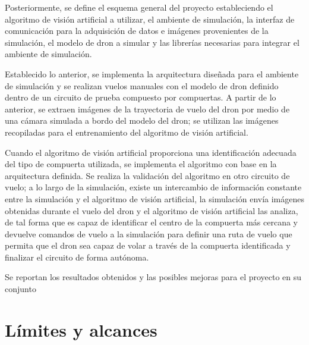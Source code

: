 Posteriormente, se define el esquema general del proyecto estableciendo el algoritmo de visión artificial a utilizar, el ambiente de simulación, la interfaz de comunicación para la adquisición de datos e imágenes provenientes de la simulación, el modelo de dron a simular y las librerías necesarias para integrar el ambiente de simulación.

Establecido lo anterior, se implementa la arquitectura diseñada para el ambiente de simulación y se realizan vuelos manuales con el modelo de dron definido dentro de un circuito de prueba compuesto por compuertas. A partir de lo anterior, se extraen imágenes de la trayectoria de vuelo del dron por medio de una cámara simulada a bordo del modelo del dron; se utilizan las imágenes recopiladas para el entrenamiento del algoritmo de visión artificial.

Cuando el algoritmo de visión artificial proporciona una identificación adecuada del tipo de compuerta utilizada, se implementa el algoritmo con base en la arquitectura definida. Se realiza la validación del algoritmo en otro circuito de vuelo; a lo largo de la simulación, existe un intercambio de información constante entre la simulación y el algoritmo de visión artificial, la simulación envía imágenes obtenidas durante el vuelo del dron y el algoritmo de visión artificial las analiza, de tal forma que es capaz de identificar el centro de la compuerta más cercana y devuelve comandos de vuelo a la simulación para definir una ruta de vuelo que permita que el dron sea capaz de volar a través de la compuerta identificada y finalizar el circuito de forma autónoma.

Se reportan los resultados obtenidos y las posibles mejoras para el proyecto en su conjunto



\section{Límites y alcances}

